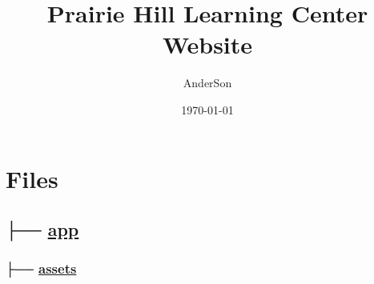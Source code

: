 \documentclass[11pt]{article}
\author{AnderSon}
\date{\today}
\title{Prairie Hill Learning Center Website}
\begin{document}
\maketitle

\section*{Files}
\label{sec-1}

\subsection*{├── \href{./app}{app}}
\label{sec-1-1}

\subsubsection*{├── \href{./app/assets}{assets}}
\label{sec-1-1-1}
\end{document}
